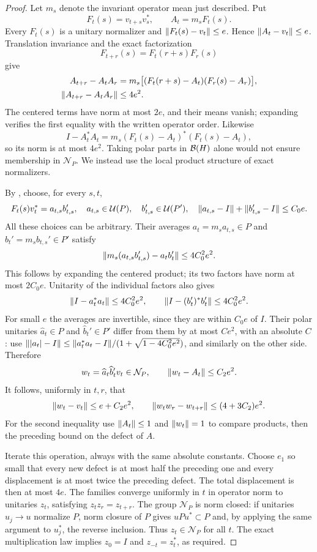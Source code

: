 \begin{proof}
Let $m_s$ denote the invariant operator mean just described. Put
\[
 F_t(s)=v_{t+s}v_s^*,\qquad A_t=m_sF_t(s).
\]
Every $F_t(s)$ is a unitary normalizer and
$\lVert F_t(s)-v_t\rVert\le e$. Hence $\lVert A_t-v_t\rVert\le e$.
Translation invariance and the exact factorization
\[
 F_{t+r}(s)=F_t(r+s)F_r(s)
\]
give
\begin{align*}
 A_{t+r}-A_tA_r
 &=m_s\bigl[(F_t(r+s)-A_t)(F_r(s)-A_r)\bigr],\\
 \lVert A_{t+r}-A_tA_r\rVert&\le4e^2.
\end{align*}
The centered terms have norm at most $2e$, and their means vanish;
expanding verifies the first equality with the written operator
order. Likewise
\[
 I-A_t^*A_t
 =m_s(F_t(s)-A_t)^*(F_t(s)-A_t),
\]
so its norm is at most $4e^2$. Taking polar parts in $\mathcal B(H)$
alone would not ensure membership in $\mathcal N_P$. We instead
use the local product structure of exact normalizers.

By , choose, for every $s,t$,
\[
 F_t(s)v_t^*=a_{t,s}b_{t,s}',
 \quad a_{t,s}\in\mathcal U(P),\quad b_{t,s}'\in\mathcal U(P'),
 \quad
 \lVert a_{t,s}-I\rVert+\lVert b_{t,s}'-I\rVert\le C_0e.
\]
All these choices can be arbitrary. Their averages
$a_t=m_sa_{t,s}\in P$ and $b_t'=m_sb_{t,s}'\in P'$ satisfy
\[
 \lVert m_s(a_{t,s}b_{t,s}')-a_tb_t'\rVert\le4C_0^2e^2.
\]
This follows by expanding the centered product; its two factors
have norm at most $2C_0e$. Unitarity of the individual factors
also gives
\[
 \lVert I-a_t^*a_t\rVert\le4C_0^2e^2,
 \qquad \lVert I-(b_t')^*b_t'\rVert\le4C_0^2e^2.
\]
For small $e$ the averages are invertible, since they are within
$C_0e$ of $I$. Their polar unitaries $\widehat a_t\in P$ and
$\widehat b_t'\in P'$ differ from them by at most $Ce^2$, with
an absolute $C$: use $\lVert|a_t|-I\rVert\le
\lVert a_t^*a_t-I\rVert/(1+\sqrt{1-4C_0^2e^2})$, and similarly on
the other side. Therefore
\[
 w_t=\widehat a_t\widehat b_t'v_t\in\mathcal N_P,
 \qquad \lVert w_t-A_t\rVert\le C_2e^2.
\]
It follows, uniformly in $t,r$, that
\[
 \lVert w_t-v_t\rVert\le e+C_2e^2,
 \qquad
 \lVert w_tw_r-w_{t+r}\rVert\le(4+3C_2)e^2.
\]
For the second inequality use $\lVert A_t\rVert\le1$ and
$\lVert w_t\rVert=1$ to compare products, then the preceding bound
on the defect of $A$.

Iterate this operation, always with the same absolute constants.
Choose $e_1$ so small that every new defect is at most half the
preceding one and every displacement is at most twice the preceding
defect. The total displacement is then at most $4e$.
The families converge uniformly in $t$ in operator norm to
unitaries $z_t$, satisfying $z_tz_r=z_{t+r}$.
The group $\mathcal N_P$ is norm closed: if unitaries $u_j\to u$
normalize $P$, norm closure of $P$ gives $uPu^*\subset P$ and,
by applying the same argument to $u_j^*$, the reverse inclusion.
Thus $z_t\in\mathcal N_P$ for all $t$. The exact multiplication
law implies $z_0=I$ and $z_{-t}=z_t^*$, as required.
\end{proof}

